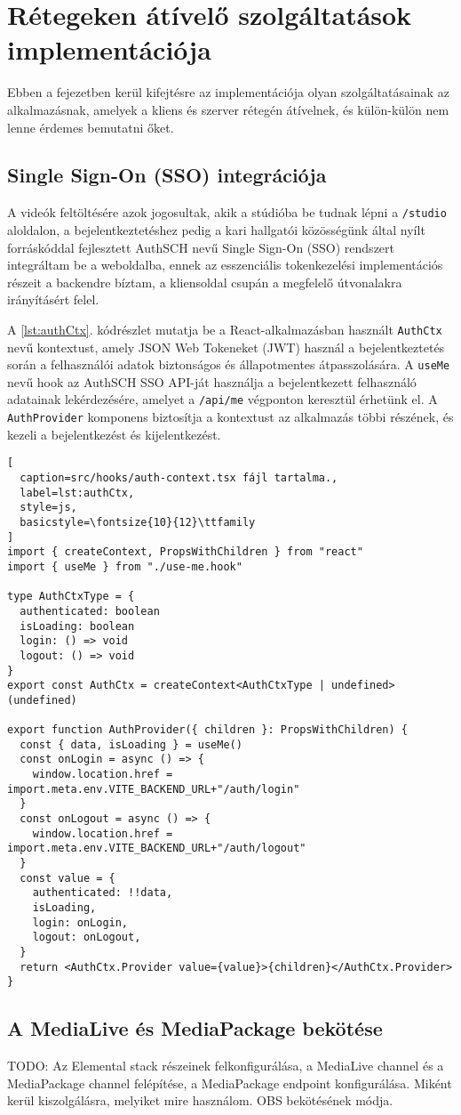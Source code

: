 \chapter{Rétegeken átívelő szolgáltatások implementációja}

Ebben a fejezetben kerül kifejtésre az implementációja olyan szolgáltatásainak az alkalmazásnak, amelyek a kliens és szerver rétegén átívelnek, és külön-külön nem lenne érdemes bemutatni őket.

\section{Single Sign-On (SSO) integrációja}

A videók feltöltésére azok jogosultak, akik a stúdióba be tudnak lépni a \verb|/studio| aloldalon, a bejelentkeztetéshez pedig a kari hallgatói közösségünk által nyílt forráskóddal fejlesztett AuthSCH nevű Single Sign-On (SSO) rendszert integráltam be a weboldalba,  ennek az esszenciális tokenkezelési implementációs részeit a backendre bíztam, a kliensoldal csupán a megfelelő útvonalakra irányításért felel.

A \ref{lst:authCtx}. kódrészlet mutatja be a React-alkalmazásban használt \verb|AuthCtx| nevű kontextust, amely JSON Web Tokeneket (JWT) használ a bejelentkeztetés során a felhasználói adatok biztonságos és állapotmentes átpasszolására. A \verb|useMe| nevű hook az AuthSCH SSO API-ját használja a bejelentkezett felhasználó adatainak lekérdezésére, amelyet a \verb|/api/me| végponton keresztül érhetünk el. A \verb|AuthProvider| komponens biztosítja a kontextust az alkalmazás többi részének, és kezeli a bejelentkezést és kijelentkezést.

\begin{minipage}{0.92\textwidth}
  \begin{lstlisting}[
  caption=src/hooks/auth-context.tsx fájl tartalma.,
  label=lst:authCtx,
  style=js,
  basicstyle=\fontsize{10}{12}\ttfamily
]
import { createContext, PropsWithChildren } from "react"
import { useMe } from "./use-me.hook"

type AuthCtxType = {
  authenticated: boolean
  isLoading: boolean
  login: () => void
  logout: () => void
}
export const AuthCtx = createContext<AuthCtxType | undefined>(undefined)

export function AuthProvider({ children }: PropsWithChildren) {
  const { data, isLoading } = useMe()
  const onLogin = async () => {
    window.location.href = import.meta.env.VITE_BACKEND_URL+"/auth/login"
  }
  const onLogout = async () => {
    window.location.href = import.meta.env.VITE_BACKEND_URL+"/auth/logout"
  }
  const value = {
    authenticated: !!data,
    isLoading,
    login: onLogin,
    logout: onLogout,
  }
  return <AuthCtx.Provider value={value}>{children}</AuthCtx.Provider>
}
\end{lstlisting}
\end{minipage}

\section{A MediaLive és MediaPackage bekötése}

TODO: Az Elemental stack részeinek felkonfigurálása, a MediaLive channel és a MediaPackage channel felépítése, a MediaPackage endpoint konfigurálása. Miként kerül kiszolgálásra, melyiket mire használom. OBS bekötésének módja.
